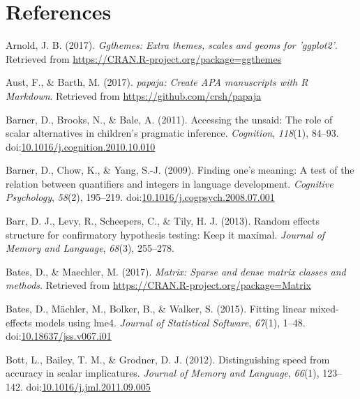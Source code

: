 \documentclass[man]{apa6}
\theoremstyle{definition}
\theoremstyle{definition}
\theoremstyle{definition}
\theoremstyle{remark}
\begin{document}
\newpage

\section{References}\label{references}

\setlength{\parindent}{-0.5in} \setlength{\leftskip}{0.5in}

\hypertarget{refs}{}
\hypertarget{ref-R-ggthemes}{}
Arnold, J. B. (2017). \emph{Ggthemes: Extra themes, scales and geoms for
'ggplot2'}. Retrieved from
\url{https://CRAN.R-project.org/package=ggthemes}

\hypertarget{ref-R-papaja}{}
Aust, F., \& Barth, M. (2017). \emph{papaja: Create APA manuscripts with
R Markdown}. Retrieved from \url{https://github.com/crsh/papaja}

\hypertarget{ref-barner2011}{}
Barner, D., Brooks, N., \& Bale, A. (2011). Accessing the unsaid: The
role of scalar alternatives in children's pragmatic inference.
\emph{Cognition}, \emph{118}(1), 84--93.
doi:\href{https://doi.org/10.1016/j.cognition.2010.10.010}{10.1016/j.cognition.2010.10.010}

\hypertarget{ref-barner2009}{}
Barner, D., Chow, K., \& Yang, S.-J. (2009). Finding one's meaning: A
test of the relation between quantifiers and integers in language
development. \emph{Cognitive Psychology}, \emph{58}(2), 195--219.
doi:\href{https://doi.org/10.1016/j.cogpsych.2008.07.001}{10.1016/j.cogpsych.2008.07.001}

\hypertarget{ref-barr2013random}{}
Barr, D. J., Levy, R., Scheepers, C., \& Tily, H. J. (2013). Random
effects structure for confirmatory hypothesis testing: Keep it maximal.
\emph{Journal of Memory and Language}, \emph{68}(3), 255--278.

\hypertarget{ref-R-Matrix}{}
Bates, D., \& Maechler, M. (2017). \emph{Matrix: Sparse and dense matrix
classes and methods}. Retrieved from
\url{https://CRAN.R-project.org/package=Matrix}

\hypertarget{ref-R-lme4}{}
Bates, D., Mächler, M., Bolker, B., \& Walker, S. (2015). Fitting linear
mixed-effects models using lme4. \emph{Journal of Statistical Software},
\emph{67}(1), 1--48.
doi:\href{https://doi.org/10.18637/jss.v067.i01}{10.18637/jss.v067.i01}

\hypertarget{ref-bott2012}{}
Bott, L., Bailey, T. M., \& Grodner, D. J. (2012). Distinguishing speed
from accuracy in scalar implicatures. \emph{Journal of Memory and
Language}, \emph{66}(1), 123--142.
doi:\href{https://doi.org/10.1016/j.jml.2011.09.005}{10.1016/j.jml.2011.09.005}
\end{document}
